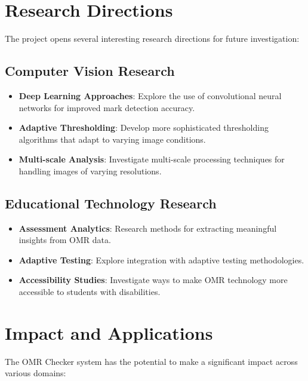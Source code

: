 \section{Research Directions}

The project opens several interesting research directions for future investigation:

\subsection{Computer Vision Research}

\begin{itemize}
\item \textbf{Deep Learning Approaches}: Explore the use of convolutional neural networks for improved mark detection accuracy.

\item \textbf{Adaptive Thresholding}: Develop more sophisticated thresholding algorithms that adapt to varying image conditions.

\item \textbf{Multi-scale Analysis}: Investigate multi-scale processing techniques for handling images of varying resolutions.
\end{itemize}

\subsection{Educational Technology Research}

\begin{itemize}
\item \textbf{Assessment Analytics}: Research methods for extracting meaningful insights from OMR data.

\item \textbf{Adaptive Testing}: Explore integration with adaptive testing methodologies.

\item \textbf{Accessibility Studies}: Investigate ways to make OMR technology more accessible to students with disabilities.
\end{itemize}

\section{Impact and Applications}

The OMR Checker system has the potential to make a significant impact across various domains:

